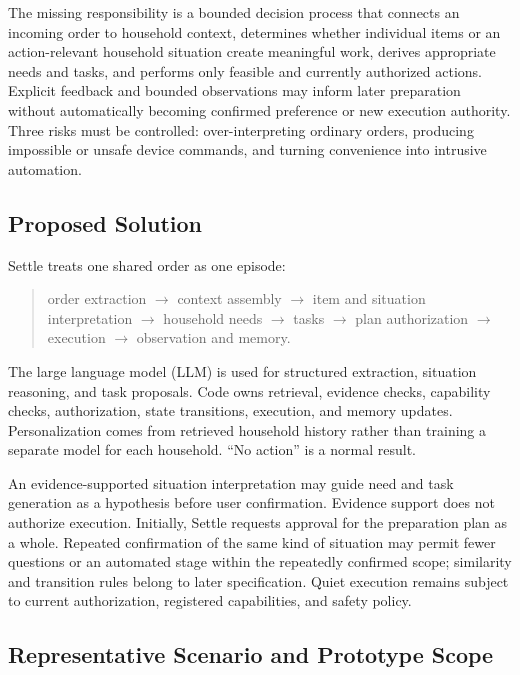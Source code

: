 \documentclass[conference]{IEEEtran}
\begin{document}
The missing responsibility is a bounded decision process that connects an incoming order to household context, determines whether individual items or an action-relevant household situation create meaningful work, derives appropriate needs and tasks, and performs only feasible and currently authorized actions. Explicit feedback and bounded observations may inform later preparation without automatically becoming confirmed preference or new execution authority. Three risks must be controlled: over-interpreting ordinary orders, producing impossible or unsafe device commands, and turning convenience into intrusive automation.

\subsection{Proposed Solution}

Settle treats one shared order as one episode:

\begin{quote}
order extraction $\rightarrow$ context assembly $\rightarrow$ item and situation interpretation $\rightarrow$ household needs $\rightarrow$ tasks $\rightarrow$ plan authorization $\rightarrow$ execution $\rightarrow$ observation and memory.
\end{quote}

The large language model (LLM) is used for structured extraction, situation reasoning, and task proposals. Code owns retrieval, evidence checks, capability checks, authorization, state transitions, execution, and memory updates. Personalization comes from retrieved household history rather than training a separate model for each household. ``No action'' is a normal result.

An evidence-supported situation interpretation may guide need and task generation as a hypothesis before user confirmation. Evidence support does not authorize execution. Initially, Settle requests approval for the preparation plan as a whole. Repeated confirmation of the same kind of situation may permit fewer questions or an automated stage within the repeatedly confirmed scope; similarity and transition rules belong to later specification. Quiet execution remains subject to current authorization, registered capabilities, and safety policy.

\subsection{Representative Scenario and Prototype Scope}
\end{document}
